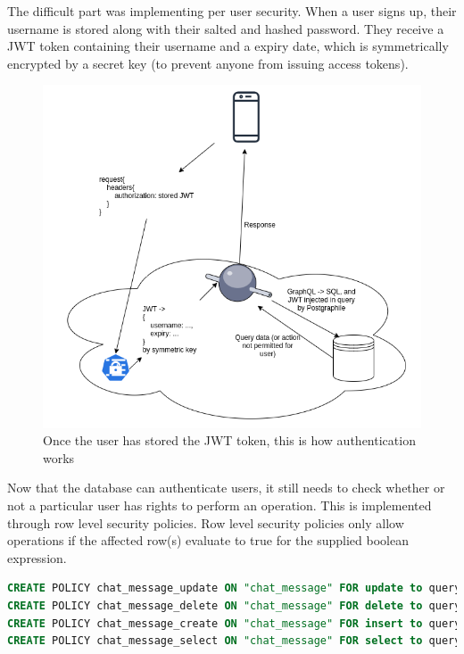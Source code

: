\documentclass{l4proj}
\begin{document}
The difficult part was implementing per user security. When a user signs up, their username is stored along with their salted and hashed password. They receive a JWT token containing their username and a expiry date, which is symmetrically encrypted by a secret key (to prevent anyone from issuing access tokens). 
\begin{figure}[bp!]
    \centering
    \includegraphics[width=1.0\linewidth]{authentication.png}    

    \caption{
  Once the user has stored the JWT token, this is how authentication works
    }
\end{figure}

Now that the database can authenticate users, it still needs to check whether or not a particular user has rights to perform an operation. This is implemented through row level security policies. Row level security policies only allow operations if the affected row(s) evaluate to true for the supplied boolean expression.


\begin{lstlisting}[language=SQL, caption={Row level security policies for accessing chat messages}, label=lst:callahan]
CREATE POLICY chat_message_update ON "chat_message" FOR update to query_sender USING (username = (select username from active_user()));
CREATE POLICY chat_message_delete ON "chat_message" FOR delete to query_sender USING (username = (select username from active_user()));
CREATE POLICY chat_message_create ON "chat_message" FOR insert to query_sender with check (username = (select username from active_user()) and groupName = (select groupName from active_user()));
CREATE POLICY chat_message_select ON "chat_message" FOR select to query_sender using (groupName = (select groupName from active_user()));
\end{lstlisting}
\end{document}
